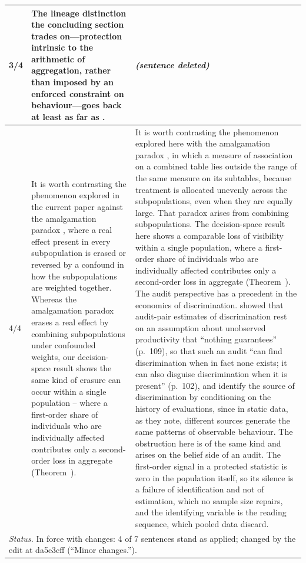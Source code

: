\documentclass[10pt]{article}
\theoremstyle{definition}
\renewcommand{\ref}[1]{\textsc{\detokenize{#1}}}
\newlength{\fullw}\setlength{\fullw}{25.9cm}
\begin{document}
{\begin{longtable}{|p{0.9cm}|p{12.2cm}|p{12.2cm}|}
3/4 & The lineage distinction the concluding section trades on---protection intrinsic to the arithmetic of aggregation, rather than imposed by an enforced constraint on behaviour---goes back at least as far as \citet{Becker1962}. & \textit{(sentence deleted)} \\ \hline
4/4 & It is worth contrasting the phenomenon explored in the current paper against the amalgamation paradox \citep{GoodMittal1987}, where a real effect present in every subpopulation is erased or reversed by a confound in how the subpopulations are weighted together. Whereas the amalgamation paradox erases a real effect by combining subpopulations under confounded weights, our decision-space result shows the same kind of erasure can occur within a single population -- where a first-order share of individuals who are individually affected contributes only a second-order loss in aggregate (Theorem~\ref{thm:LOS}). & It is worth contrasting the phenomenon explored here with the amalgamation paradox \citep{GoodMittal1987}, in which a measure of association on a combined table lies outside the range of the same measure on its subtables, because treatment is allocated unevenly across the subpopulations, even when they are equally large. That paradox arises from combining subpopulations. The decision-space result here shows a comparable loss of visibility within a single population, where a first-order share of individuals who are individually affected contributes only a second-order loss in aggregate (Theorem~\ref{thm:LOS}). The audit perspective has a precedent in the economics of discrimination. \citet{Heckman1998} showed that audit-pair estimates of discrimination rest on an assumption about unobserved productivity that ``nothing guarantees'' (p.~109), so that such an audit ``can find discrimination when in fact none exists; it can also disguise discrimination when it is present'' (p.~102), and \citet{Bohren2019} identify the source of discrimination by conditioning on the history of evaluations, since in static data, as they note, different sources generate the same patterns of observable behaviour. The obstruction here is of the same kind and arises on the belief side of an audit. The first-order signal in a protected statistic is zero in the population itself, so its silence is a failure of identification and not of estimation, which no sample size repairs, and the identifying variable is the reading sequence, which pooled data discard. \\ \hline
\multicolumn{3}{|p{\fullw}|}{\textit{Status.} In force with changes: 4 of 7 sentences stand as applied; changed by the edit at da5e3cff (``Minor changes.'').} \\ \hline

\end{longtable}}
\end{document}

